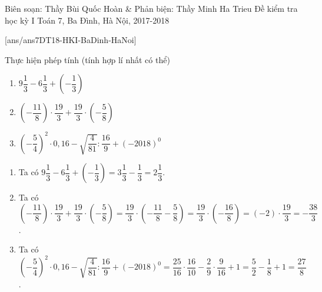 
	\begin{name}
		{Biên soạn: Thầy Bùi Quốc Hoàn \& Phản biện: Thầy Minh Ha Trieu}
		{Đề kiểm tra học kỳ I Toán 7, Ba Đình, Hà Nội, 2017-2018}
	\end{name}
	[ans/ans7DT18-HKI-BaDinh-HaNoi]
			\begin{ex}%
	Thực hiện phép tính (tính hợp lí nhất có thể)
		\begin{enumerate}
		\item $9\dfrac{1}{3} - 6\dfrac{1}{3} + \left(- \dfrac{1}{3}\right)$
		\item $\left(-\dfrac{11}{8}\right)\cdot\dfrac{19}{3} + \dfrac{19}{3}\cdot\left(- \dfrac{5}{8}\right)$
		\item $\left(-\dfrac{5}{4}\right)^2\cdot 0{,}16 - \sqrt{\dfrac{4}{81}}\colon\dfrac{16}{9} + \left(- 2018\right)^{0}$
	\end{enumerate}
				\loigiai
			{\begin{enumerate}
					\item Ta có  $9\dfrac{1}{3} - 6\dfrac{1}{3} + \left(- \dfrac{1}{3}\right) = 3\dfrac{1}{3} - \dfrac{1}{3} = 2\dfrac{1}{3}$.
					\item Ta có $\left(-\dfrac{11}{8}\right)\cdot\dfrac{19}{3} + \dfrac{19}{3}\cdot\left(- \dfrac{5}{8}\right) = \dfrac{19}{3}\cdot \left(-\dfrac{11}{8} -\dfrac{5}{8} \right) = \dfrac{19}{3}\cdot\left(-\dfrac{16}{8} \right)= \left(- 2\right)\cdot \dfrac{19}{3} = - \dfrac{38}{3}$.
					\item Ta có $\left(-\dfrac{5}{4}\right)^2\cdot 0{,}16 - \sqrt{\dfrac{4}{81}}\colon\dfrac{16}{9} + \left(- 2018\right)^{0} = \dfrac{25}{16}\cdot\dfrac{16}{10} - \dfrac{2}{9}\cdot \dfrac{9}{16} + 1 = \dfrac{5}{2} - \dfrac{1}{8} + 1 = \dfrac{27}{8}$.
				\end{enumerate}	
				}
		\end{ex}
		
